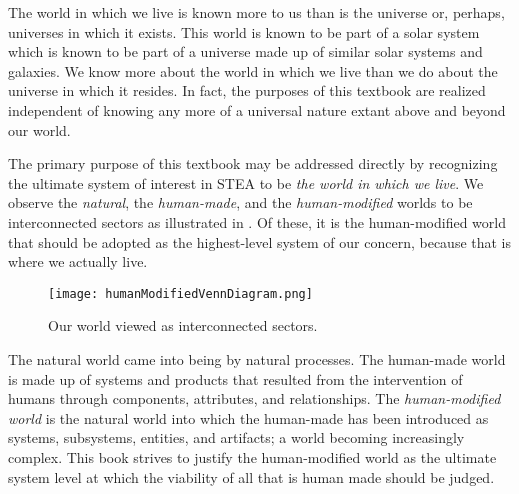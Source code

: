 The world in which we live is known more to us than is the universe or, perhaps, universes in which it exists.  This world is known to be part of a solar system which is known to be part of a universe made up of similar solar systems and galaxies.  We know more about the world in which we live than we do about the universe in which it resides.  In fact, the purposes of this textbook are realized independent of knowing any more of a universal nature extant above and beyond our world.

The primary purpose of this textbook may be addressed directly by recognizing the ultimate system of interest in STEA to be \textit{the world in which we live}.  We observe the \textit{natural}, the \textit{human-made}, and the \textit{human-modified} worlds to be interconnected sectors as illustrated in .  Of these, it is the human-modified world that should be adopted as the highest-level system of our concern, because that is where we actually live.

\begin{figure}[h]
\centering
\texttt{[image: humanModifiedVennDiagram.png]}
\caption{Our world viewed as interconnected sectors.}
\label{fig:humanModifiedVennDiagram}
\end{figure}

The natural world came into being by natural processes.  The human-made world is made up of systems and products that resulted from the intervention of humans through components, attributes, and relationships.  The \textit{human-modified world} is the natural world into which the human-made has been introduced as systems, subsystems, entities, and artifacts; a world becoming increasingly complex.  This book strives to justify the human-modified world as the ultimate system level at which the viability of all that is human made should be judged.